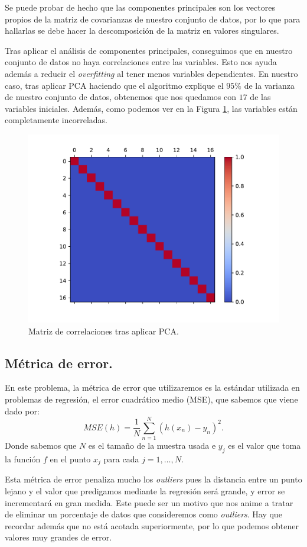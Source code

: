 \documentclass[a4paper, 20pt]{article}
\begin{document}
Se puede probar de hecho que las componentes principales son los vectores propios de la matriz de covarianzas de nuestro conjunto de datos, por lo que para hallarlas se debe hacer la descomposición de la matriz en valores singulares.

Tras aplicar el análisis de componentes principales, conseguimos que en nuestro conjunto de datos no haya correlaciones entre las variables. Esto nos ayuda además a reducir el \emph{overfitting} al tener menos variables dependientes. En nuestro caso, tras aplicar PCA haciendo que el algoritmo explique el $95\%$ de la varianza de nuestro conjunto de datos, obtenemos que nos quedamos con $17$ de las variables iniciales. Además, como podemos ver en la Figura \ref{fig:corr-pca}, las variables están completamente incorreladas.

\begin{figure}[H]
  \centering
  \includegraphics[width=0.55\linewidth]{media/corr-pca.pdf}
  \caption{Matriz de correlaciones tras aplicar PCA. }
  \label{fig:corr-pca}
\end{figure}




\subsection{Métrica de error.}

En este problema, la métrica de error que utilizaremos es la estándar utilizada en problemas de regresión, el error cuadrático medio (MSE), que sabemos que viene dado por:
\[
MSE(h) = \frac{1}{N} \sum_{n = 1}^N (h(x_n) - y_n)^2.
\]
Donde sabemos que $N$ es el tamaño de la muestra usada e $y_j$ es el valor que toma la función $f$ en el punto $x_j$ para cada $j = 1,\dots ,N$. 

Esta métrica de error penaliza mucho los \emph{outliers} pues la distancia entre un punto lejano y el valor que predigamos mediante la regresión será grande, y error se incrementará en gran medida. Este puede ser un motivo que nos anime a tratar de eliminar un porcentaje de datos que consideremos como \emph{outliers}. Hay que recordar además que no está acotada superiormente, por lo que podemos obtener valores muy grandes de error.
\end{document}
